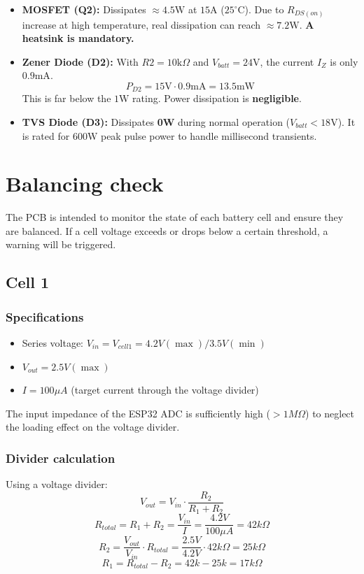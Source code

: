 \documentclass{article}
\begin{document}
\begin{itemize}
    \item \textbf{MOSFET (Q2):} Dissipates $\approx 4.5\text{W}$ at $15\text{A}$ ($25^\circ\text{C}$). Due to $R_{DS(on)}$ increase at high temperature, real dissipation can reach $\approx 7.2\text{W}$. \textbf{A heatsink is mandatory.}
    
    \item \textbf{Zener Diode (D2):} With $R2 = 10\text{k}\Omega$ and $V_{batt} = 24\text{V}$, the current $I_Z$ is only $0.9\text{mA}$. 
    $$P_{D2} = 15\text{V} \cdot 0.9\text{mA} = 13.5\text{mW}$$
    This is far below the $1\text{W}$ rating. Power dissipation is \textbf{negligible}.

    \item \textbf{TVS Diode (D3):} Dissipates \textbf{0W} during normal operation ($V_{batt} < 18\text{V}$). It is rated for $600\text{W}$ peak pulse power to handle millisecond transients.
\end{itemize}

\section{Balancing check}
The PCB is intended to monitor the state of each battery cell and ensure they are balanced.
If a cell voltage exceeds or drops below a certain threshold, a warning will be triggered.

\subsection{Cell 1}
\subsubsection{Specifications}
\begin{itemize}
\item Series voltage: $V_{in} = V_{cell1} = 4.2V (\max) / 3.5V (\min)$
\item $V_{out} = 2.5V (\max)$
\item $I = 100\mu A$ (target current through the voltage divider)
\end{itemize}
The input impedance of the ESP32 ADC is sufficiently high ($>1M\Omega$) to neglect the loading effect on the voltage divider.

\subsubsection{Divider calculation}
Using a voltage divider:
$$V_{out} = V_{in} \cdot \frac{R_2}{R_1 + R_2}$$
$$R_{total} = R_1 + R_2 = \frac{V_{in}}{I} = \frac{4.2V}{100\mu A} = 42k\Omega$$
$$R_2 = \frac{V_{out}}{V_{in}} \cdot R_{total} = \frac{2.5V}{4.2V} \cdot 42k\Omega = 25k\Omega$$
$$R_1 = R_{total} - R_2 = 42k - 25k = 17k\Omega$$
\end{document}
